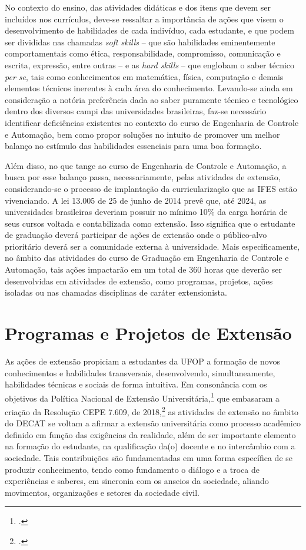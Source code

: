 \documentclass[
	12pt,				%
	openright,			%
	oneside,			%
	a4paper,			%
	english,			%
	brazil				%
	]{abntex2}
\begin{document}
No contexto do ensino, das atividades didáticas e dos itens que devem ser incluídos nos currículos, deve-se ressaltar a importância de ações que visem o desenvolvimento de habilidades de cada indivíduo, cada estudante, e que podem ser divididas nas chamadas \textit{soft skills} -- que são habilidades eminentemente comportamentais como ética, responsabilidade, compromisso, comunicação e escrita, expressão, entre outras -- e as \textit{hard skills} -- que englobam o saber técnico \emph{per se}, tais como conhecimentos em matemática, física, computação e demais elementos técnicos inerentes à cada área do conhecimento. Levando-se ainda em consideração a notória preferência dada ao saber puramente técnico e tecnológico dentro dos diversos campi das universidades brasileiras, faz-se necessário identificar deficiências existentes no contexto do curso de Engenharia de Controle e Automação, bem como propor soluções no intuito de promover um melhor balanço no estímulo das habilidades essenciais para uma boa formação.

Além disso, no que tange ao curso de Engenharia de Controle e Automação, a busca por esse balanço passa, necessariamente, pelas atividades de extensão, considerando-se o processo de implantação da curricularização que as IFES estão vivenciando. A lei 13.005 de 25 de junho de 2014 prevê que, até 2024, as universidades brasileiras deveriam possuir no mínimo 10\% da carga horária de seus cursos voltada e contabilizada como extensão. Isso significa que o estudante de graduação deverá participar de ações de extensão onde o público-alvo prioritário deverá ser a comunidade externa à universidade. Mais especificamente, no âmbito das atividades do curso de Graduação em Engenharia de Controle e Automação, tais ações impactarão em um total de 360 horas que deverão ser desenvolvidas em atividades de extensão, como programas, projetos, ações isoladas ou nas chamadas disciplinas de caráter extensionista.

\section{Programas e Projetos de Extensão}
As ações de extensão propiciam a estudantes da UFOP a formação de novos conhecimentos e habilidades transversais, desenvolvendo, simultaneamente, habilidades técnicas e sociais de forma intuitiva. Em consonância com os objetivos da Política Nacional de Extensão Universitária,\footcite{forproex2012} que embasaram a criação da Resolução CEPE 7.609, de 2018,\footcite[][]{resolucao-cepe-7609} as atividades de extensão no âmbito do DECAT se voltam a afirmar a extensão universitária como processo acadêmico definido em função das exigências da realidade, além de ser importante elemento na formação do estudante, na qualificação da(o) docente e no intercâmbio com a sociedade. Tais contribuições são fundamentadas em uma forma específica de se produzir conhecimento, tendo como fundamento o  diálogo e a troca de experiências e saberes, em sincronia com os anseios da sociedade, aliando movimentos, organizações e setores da sociedade civil.
\end{document}
